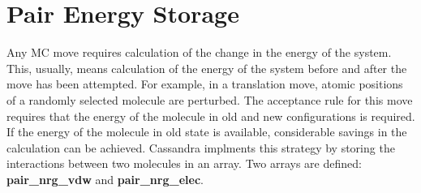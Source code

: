\section*{Pair Energy Storage}
Any MC move requires calculation of the change in the energy of the system. This, usually,
means calculation of the energy of the system before and after the move has been 
attempted. For example, in a translation move, atomic positions of a randomly selected
molecule are perturbed. The acceptance rule for this move requires that the energy of the
molecule in old and new configurations is required. If the energy of the molecule in old
state is available, considerable savings in the calculation can be achieved. Cassandra
implments this strategy by storing the interactions between two molecules in an array.
Two arrays are defined: {\bf pair\_nrg\_vdw} and {\bf pair\_nrg\_elec}.
